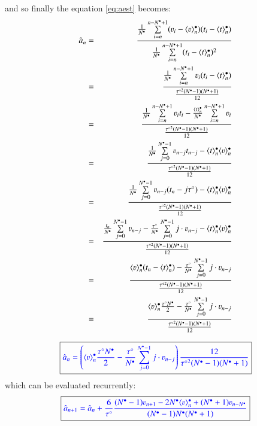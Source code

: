 \clearpage
and so finally the equation \ref{eq:aest} becomes:  
\begin{eqnarray}
\hat{a}_n &=& \frac{\frac {1}{N^\bullet}\sum\limits_{i=n}^{n-N^\bullet+1}(\varv_i - \langle \varv \rangle^\bullet_n)(t_i-\langle t\rangle^\bullet_n)}{\frac {1}{N^\bullet} \sum\limits_{i=n}^{n-N^\bullet+1}(t_i- \langle t\rangle^\bullet_n)^2}\nonumber\\
&=& \frac{\frac {1}{N^\bullet}\sum\limits_{i=n}^{n-N^\bullet+1} \varv_i (t_i-\langle t\rangle^\bullet_n)}{\frac {\tau^{\circ 2} (N^\bullet-1)(N^\bullet+1)}{12} }\nonumber\\
&=& \frac{\frac {1}{N^\bullet}\sum\limits_{i=n}^{n-N^\bullet+1} \varv_i t_i -\frac {\langle t\rangle^\bullet_n }{N^\bullet}\sum\limits_{i=n}^{n-N^\bullet+1}\varv_i}{\frac {\tau^{\circ 2} (N^\bullet-1)(N^\bullet+1)}{12} }\nonumber\\
&=& \frac{\frac {1}{N^\bullet}\sum\limits_{j=0}^{N^\bullet-1} \varv_{n-j} t_{n-j} -\langle t\rangle^\bullet_n \langle \varv \rangle^\bullet_n}{\frac {\tau^{\circ 2} (N^\bullet-1)(N^\bullet+1)}{12} }\nonumber\\
&=& \frac{\frac {1}{N^\bullet}\sum\limits_{j=0}^{N^\bullet-1} \varv_{n-j} (t_n- j\tau^\circ) -\langle t\rangle^\bullet_n \langle \varv \rangle^\bullet_n}{\frac {\tau^{\circ 2} (N^\bullet-1)(N^\bullet+1)}{12} }\nonumber\\
&=& \frac{\frac {t_n}{N^\bullet}\sum\limits_{j=0}^{N^\bullet-1} \varv_{n-j} -\frac{\tau^\circ}{N^\bullet}\sum\limits_{j=0}^{N^\bullet-1} j\cdot \varv_{n-j} -\langle t\rangle^\bullet_n \langle \varv \rangle^\bullet_n}{\frac {\tau^{\circ 2} (N^\bullet-1)(N^\bullet+1)}{12} }\nonumber\\
&=& \frac{\langle \varv \rangle^\bullet_n (t_n-\langle t\rangle^\bullet_n ) -\frac{\tau^\circ }{N^\bullet}\sum\limits_{j=0}^{N^\bullet-1} j\cdot \varv_{n-j}}{\frac {\tau^{\circ 2} (N^\bullet-1)(N^\bullet+1)}{12} }\nonumber\\
&=& \frac{\langle \varv \rangle^\bullet_n \frac{\tau^\circ N^\bullet}{2} -\frac{\tau^\circ}{N^\bullet}\sum\limits_{j=0}^{N^\bullet-1} j\cdot \varv_{n-j}}{\frac {\tau^{\circ 2} (N^\bullet-1)(N^\bullet+1)}{12} }
\end{eqnarray}

\begin{equation}
\boxed{\color{blue}
\hat{a}_n= \left( \langle \varv \rangle^\bullet_n \frac{\tau^\circ N^\bullet}{2} -\frac{\tau^\circ}{N^\bullet}\sum\limits_{j=0}^{N^\bullet-1} j\cdot \varv_{n-j}\right) \frac {12}{\tau^{\circ 2} (N^\bullet-1)(N^\bullet+1)} 
}
\label{eq:aestls}
\end{equation}
which can be evaluated recurrently:
\begin{equation}
\boxed{\color{blue}
\hat{a}_{n+1}= \hat{a}_{n}+ \frac{6}{\tau^\circ }\frac{(N^\bullet-1)\varv_{n+1}-2N^\bullet\langle \varv\rangle^\bullet_n+(N^\bullet+1)\varv_{n-N^\bullet}}{ (N^\bullet-1)N^\bullet(N^\bullet+1)} 
}
\end{equation}

